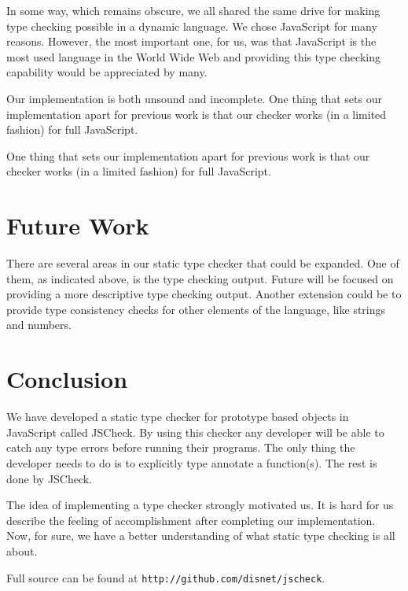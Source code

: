 \documentclass{article}
\begin{document}
In some way, which remains obscure, we all shared the same drive for making type 
checking possible in a dynamic language. We chose JavaScript for many reasons. 
However, the most important one, for us, was that JavaScript is the most used 
language in the World Wide Web and providing this type checking capability would
be appreciated by many. 

Our implementation is both unsound and incomplete. One thing that sets our 
implementation apart for previous work is that our checker works (in a limited 
fashion) for full JavaScript.

One thing that sets our 
implementation apart for previous work is that our checker works (in a limited fashion) for
full JavaScript.

\section{Future Work}
\label{sec:future}
There are several areas in our static type checker that could be expanded. One of
them, as indicated above, is the type checking output. Future will be focused on 
providing a more descriptive type checking output. Another extension could be to
provide type consistency checks for other elements of the language, like strings
and numbers.



\section{Conclusion}
\label{sec:conclusion}
We have developed a static type checker for prototype based objects in JavaScript
called JSCheck. By using this checker any developer will be able to catch any 
type errors before running their programs. The only thing the developer needs to
do is to explicitly type annotate a function(s). The rest is done by JSCheck. 

The idea of implementing a type checker strongly motivated us. It is hard for us 
describe the feeling of accomplishment after completing our implementation. Now,
for sure, we have a better understanding of what static type checking is all about. 

Full source can be found at {\tt http://github.com/disnet/jscheck}.



\end{document}
